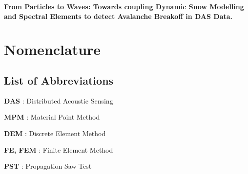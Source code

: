\documentclass[10pt]{article}
\begin{document}
{\centering \Large \textbf{From Particles to Waves: Towards coupling Dynamic Snow Modelling and Spectral Elements to detect Avalanche Breakoff in DAS Data.}\par}

\section{Nomenclature}
\subsection{List of Abbreviations}
\begin{description}
  \item \textbf{DAS} : Distributed Acoustic Sensing
  \item \textbf{MPM} : Material Point Method
  \item \textbf{DEM} : Discrete Element Method
  \item \textbf{FE, FEM} : Finite Element Method
  \item \textbf{PST} : Propagation Saw Test
\end{description}
\end{document}
